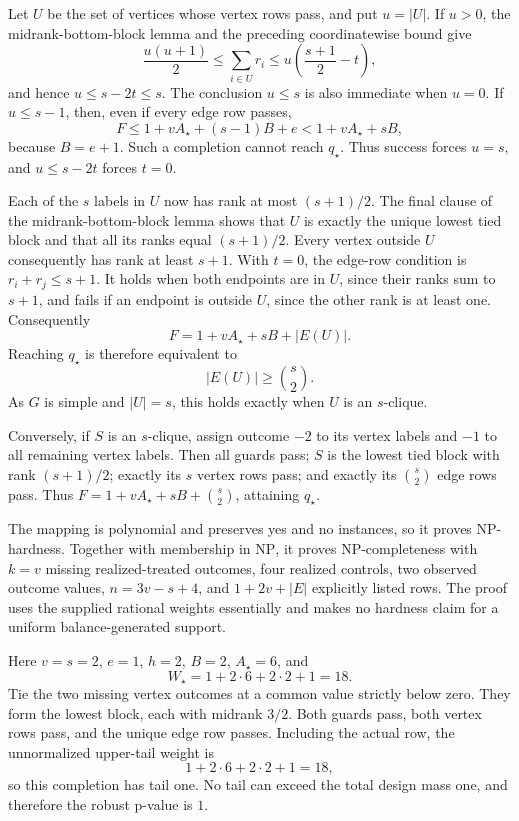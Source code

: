 Let \(U\) be the set of vertices whose vertex rows pass, and put \(u=|U|\).  If \(u>0\), the midrank-bottom-block lemma and the preceding coordinatewise bound give
\[
\frac{u(u+1)}2
\le\sum_{i\in U}r_i
\le u\left(\frac{s+1}{2}-t\right),
\]
and hence \(u\le s-2t\le s\).  The conclusion \(u\le s\) is also immediate when \(u=0\).  If \(u\le s-1\), then, even if every edge row passes,
\[
F\le1+vA_\star+(s-1)B+e
<1+vA_\star+sB,
\]
because \(B=e+1\).  Such a completion cannot reach \(q_\star\).  Thus success forces \(u=s\), and \(u\le s-2t\) forces \(t=0\).

Each of the \(s\) labels in \(U\) now has rank at most \((s+1)/2\).  The final clause of the midrank-bottom-block lemma shows that \(U\) is exactly the unique lowest tied block and that all its ranks equal \((s+1)/2\).  Every vertex outside \(U\) consequently has rank at least \(s+1\).  With \(t=0\), the edge-row condition is \(r_i+r_j\le s+1\).  It holds when both endpoints are in \(U\), since their ranks sum to \(s+1\), and fails if an endpoint is outside \(U\), since the other rank is at least one.  Consequently
\[
F=1+vA_\star+sB+|E(U)|.
\]
Reaching \(q_\star\) is therefore equivalent to
\[
|E(U)|\ge\binom{s}{2}.
\]
As \(G\) is simple and \(|U|=s\), this holds exactly when \(U\) is an \(s\)-clique.

Conversely, if \(S\) is an \(s\)-clique, assign outcome \(-2\) to its vertex labels and \(-1\) to all remaining vertex labels.  Then all guards pass; \(S\) is the lowest tied block with rank \((s+1)/2\); exactly its \(s\) vertex rows pass; and exactly its \(\binom{s}{2}\) edge rows pass.  Thus \(F=1+vA_\star+sB+\binom{s}{2}\), attaining \(q_\star\).

The mapping is polynomial and preserves yes and no instances, so it proves NP-hardness.  Together with membership in \(\mathrm{NP}\), it proves NP-completeness with \(k=v\) missing realized-treated outcomes, four realized controls, two observed outcome values, \(n=3v-s+4\), and \(1+2v+|E|\) explicitly listed rows.  The proof uses the supplied rational weights essentially and makes no hardness claim for a uniform balance-generated support.

Here \(v=s=2\), \(e=1\), \(h=2\), \(B=2\), \(A_\star=6\), and
\[
W_\star=1+2\cdot6+2\cdot2+1=18.
\]
Tie the two missing vertex outcomes at a common value strictly below zero.  They form the lowest block, each with midrank \(3/2\).  Both guards pass, both vertex rows pass, and the unique edge row passes.  Including the actual row, the unnormalized upper-tail weight is
\[
1+2\cdot6+2\cdot2+1=18,
\]
so this completion has tail one.  No tail can exceed the total design mass one, and therefore the robust p-value is \(1\).

